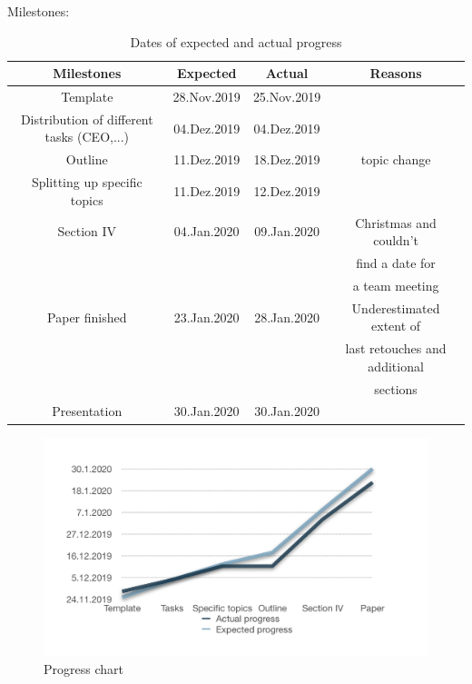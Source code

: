 Milestones:
\begin{table}[H]
\caption{Dates of expected and actual progress}
\centering
\begin{tabular}{cccc}
\toprule
Milestones & Expected & Actual& Reasons\\
\midrule
Template & 28.Nov.2019 & 25.Nov.2019&\\
Distribution of different tasks (CEO,...) & 04.Dez.2019 &04.Dez.2019&\\
Outline & 11.Dez.2019& 18.Dez.2019& topic change\\
Splitting up specific topics & 11.Dez.2019&12.Dez.2019\\
Section IV & 04.Jan.2020&09.Jan.2020& Christmas and couldn't\\
&&& find a date for \\ &&& a team meeting\\
Paper finished& 23.Jan.2020& 28.Jan.2020& Underestimated extent of\\
&&& last retouches and additional \\
&&&sections\\
Presentation & 30.Jan.2020&30.Jan.2020&\\
\bottomrule
\end{tabular}
\end{table}
\begin{parcolumns}[colwidths={1=2.5 cm, 2=10 cm, 3=2.5cm}]{3}
\colchunk{}
\end{parcolumns}
\begin{figure}[H]
\centering
\includegraphics[scale=0.5]{Progress_chart}
\caption{Progress chart}
\end{figure}